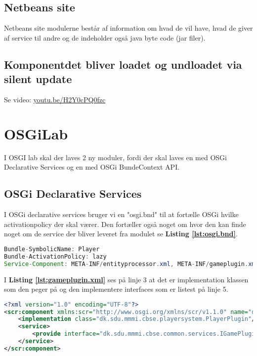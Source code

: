 \subsection{Netbeans site}
Netbeans site modulerne består af information om hvad de vil have, hvad de giver
af service til andre og de indeholder også java byte code (jar filer).

\subsection{Komponentdet bliver loadet og undloadet via silent update}
Se video: \href{https://www.youtube.com/watch?v=H2Y0cPQ0fzc}{youtu.be/H2Y0cPQ0fzc}


\newpage
\section{OSGiLab}
I OSGI lab skal der laves 2 ny moduler, fordi der skal laves en med OSGi
Declarative Services og en med OSGi BundeContext API.

\subsection{OSGi Declarative Services}
I OSGi declarative services bruger vi en "osgi.bnd" til at fortælle OSGi hvilke
activationpolicy der skal værer. Den fortæller også noget om hvor den kan finde
noget om de service der bliver leveret fra modulet se \textbf{Listing
\ref{lst:osgi.bnd}}.


\begin{lstlisting}[caption={osgi.bnd}, label={lst:osgi.bnd}, language=java]
Bundle-SymbolicName: Player
Bundle-ActivationPolicy: lazy
Service-Component: META-INF/entityprocessor.xml, META-INF/gameplugin.xml
\end{lstlisting}

I \textbf{Listing \ref{lst:gameplugin.xml}} ses på linje 3 at det er
implementation klassen som den peger på og den implementere interfaces som er
listest på linje 5.

\begin{lstlisting}[caption={gameplugin.xml}, label={lst:gameplugin.xml}, language=xml]
<?xml version="1.0" encoding="UTF-8"?>
<scr:component xmlns:scr="http://www.osgi.org/xmlns/scr/v1.1.0" name="dk.sdu.mmmi.cbse.playersystem.plugin">
    <implementation class="dk.sdu.mmmi.cbse.playersystem.PlayerPlugin"/>
    <service>
        <provide interface="dk.sdu.mmmi.cbse.common.services.IGamePluginService"/>
    </service>
</scr:component>
\end{lstlisting}


